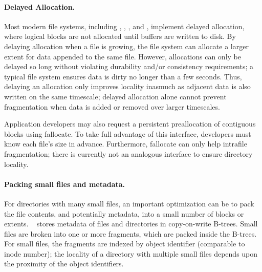 \paragraph{Delayed Allocation.} Most modern file systems, including \ext, \xfs,
\btrfs, and \zfs, implement delayed allocation, where 
logical blocks are not allocated until buffers are written to disk. 
By delaying allocation when a file is growing,
the file system can allocate a larger extent for data appended to the same file.
However, allocations can only be delayed so long without
violating durability and/or consistency requirements; a typical
file system ensures data is dirty no longer than a few seconds.
Thus, delaying an allocation only improves locality inasmuch
as adjacent data is also written on the same timescale;
delayed allocation alone cannot prevent fragmentation when 
data is added or removed  over larger timescales.

Application developers may also request a persistent preallocation
of contiguous blocks using fallocate.
To take full advantage of this interface, 
developers must know each file's size in advance. %
Furthermore, fallocate can only help intrafile fragmentation; there is currently 
not an
analogous interface to ensure directory locality.

\paragraph{Packing small files and metadata.}
For directories with many small files, an important optimization 
can be to pack the file contents, and potentially metadata,
into a small number of blocks or extents.
\btrfs~\cite{DBLP:journals/tos/RodehBM13} stores metadata of files and
directories in copy-on-write B-trees. Small files are broken into one or more
fragments, which are packed inside the B-trees.  For small files, the fragments
are indexed by object identifier (comparable to inode number); the locality of
a directory with multiple small files depends upon the proximity of the object
identifiers.

